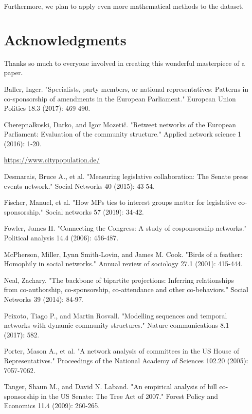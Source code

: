 \documentclass[lettersize,journal]{IEEEtran}
\begin{document}
Furthermore, we plan to apply even more mathematical methods to the dataset. %

\section*{Acknowledgments}

Thanks so much to everyone involved in creating this wonderful masterpiece of a paper.

\begin{thebibliography}{1}


Baller, Inger. "Specialists, party members, or national representatives: Patterns in co-sponsorship of amendments in the European Parliament." European Union Politics 18.3 (2017): 469-490.

Cherepnalkoski, Darko, and Igor Mozetič. "Retweet networks of the European Parliament: Evaluation of the community structure." Applied network science 1 (2016): 1-20.

\url{https://www.citypopulation.de/}

Desmarais, Bruce A., et al. "Measuring legislative collaboration: The Senate press events network." Social Networks 40 (2015): 43-54.

Fischer, Manuel, et al. "How MPs ties to interest groups matter for legislative co-sponsorship." Social networks 57 (2019): 34-42.

Fowler, James H. "Connecting the Congress: A study of cosponsorship networks." Political analysis 14.4 (2006): 456-487.

McPherson, Miller, Lynn Smith-Lovin, and James M. Cook. "Birds of a feather: Homophily in social networks." Annual review of sociology 27.1 (2001): 415-444.

Neal, Zachary. "The backbone of bipartite projections: Inferring relationships from co-authorship, co-sponsorship, co-attendance and other co-behaviors." Social Networks 39 (2014): 84-97.

Peixoto, Tiago P., and Martin Rosvall. "Modelling sequences and temporal networks with dynamic community structures." Nature communications 8.1 (2017): 582.

Porter, Mason A., et al. "A network analysis of committees in the US House of Representatives." Proceedings of the National Academy of Sciences 102.20 (2005): 7057-7062.

Tanger, Shaun M., and David N. Laband. "An empirical analysis of bill co-sponsorship in the US Senate: The Tree Act of 2007." Forest Policy and Economics 11.4 (2009): 260-265.

\end{thebibliography}


\vfill
\end{document}

